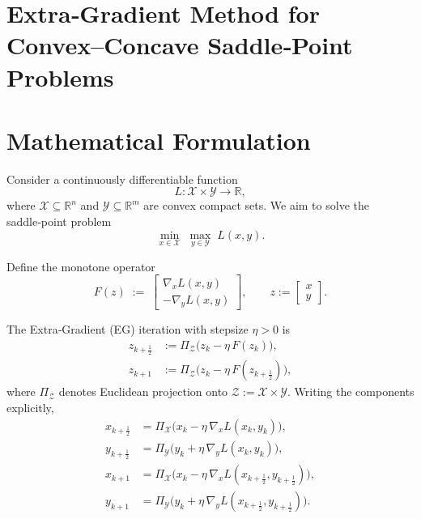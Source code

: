 \documentclass{article}
\begin{document}
\section*{Extra‑Gradient Method for Convex–Concave Saddle‑Point Problems}

\section*{Mathematical Formulation}
Consider a continuously differentiable function 
\[
L:\mathcal{X}\times\mathcal{Y}\rightarrow\mathbb{R},
\]
where $\mathcal{X}\subseteq\mathbb{R}^{n}$ and $\mathcal{Y}\subseteq\mathbb{R}^{m}$ are convex compact sets.  
We aim to solve the saddle‑point problem
\[
\min_{x\in\mathcal{X}}\;\max_{y\in\mathcal{Y}} \;L(x,y).
\]

Define the monotone operator 
\[
F(z)\;:=\;
\begin{bmatrix}
\nabla_{x}L(x,y)\\[2mm]
-\nabla_{y}L(x,y)
\end{bmatrix},
\qquad z:=\begin{bmatrix}x\\y\end{bmatrix}.
\]

The Extra‑Gradient (EG) iteration with stepsize $\eta>0$ is
\[
\begin{aligned}
z_{k+\frac12} &:= \Pi_{\mathcal{Z}}\!\bigl(z_{k}-\eta\,F(z_{k})\bigr), \tag{1}\\
z_{k+1} &:= \Pi_{\mathcal{Z}}\!\bigl(z_{k}-\eta\,F(z_{k+\frac12})\bigr), \tag{2}
\end{aligned}
\]
where $\Pi_{\mathcal{Z}}$ denotes Euclidean projection onto $\mathcal{Z}:=\mathcal{X}\times\mathcal{Y}$.
Writing the components explicitly,
\[
\begin{aligned}
x_{k+\frac12} &= \Pi_{\mathcal{X}}\!\bigl(x_{k}-\eta\,\nabla_{x}L(x_{k},y_{k})\bigr),\\
y_{k+\frac12} &= \Pi_{\mathcal{Y}}\!\bigl(y_{k}+\eta\,\nabla_{y}L(x_{k},y_{k})\bigr),\\
x_{k+1} &= \Pi_{\mathcal{X}}\!\bigl(x_{k}-\eta\,\nabla_{x}L(x_{k+\frac12},y_{k+\frac12})\bigr),\\
y_{k+1} &= \Pi_{\mathcal{Y}}\!\bigl(y_{k}+\eta\,\nabla_{y}L(x_{k+\frac12},y_{k+\frac12})\bigr).
\end{aligned}
\]
\end{document}
